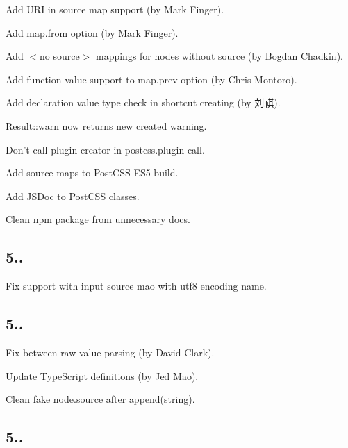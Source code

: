 \begin{DoxyItemize}
\item Add U\+RI in source map support (by Mark Finger).
\item Add {\ttfamily map.\+from} option (by Mark Finger).
\item Add {\ttfamily $<$no source$>$} mappings for nodes without source (by Bogdan Chadkin).
\item Add function value support to {\ttfamily map.\+prev} option (by Chris Montoro).
\item Add declaration value type check in shortcut creating (by 刘祺).
\item {\ttfamily Result\+::warn} now returns new created warning.
\item Don’t call plugin creator in {\ttfamily postcss.\+plugin} call.
\item Add source maps to Post\+C\+SS E\+S5 build.
\item Add J\+S\+Doc to Post\+C\+SS classes.
\item Clean npm package from unnecessary docs.
\end{DoxyItemize}

\subsection*{5..}


\begin{DoxyItemize}
\item Fix support with input source mao with {\ttfamily utf8} encoding name.
\end{DoxyItemize}

\subsection*{5..}


\begin{DoxyItemize}
\item Fix between raw value parsing (by David Clark).
\item Update Type\+Script definitions (by Jed Mao).
\item Clean fake node.\+source after {\ttfamily append(string)}.
\end{DoxyItemize}

\subsection*{5..}


